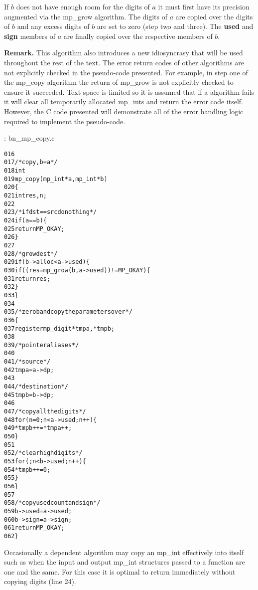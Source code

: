 \documentclass[b5paper]{book}
\begin{document}
If $b$ does not have enough room for the digits of $a$ it must first have its precision augmented via the mp\_grow 
algorithm.  The digits of $a$ are copied over the digits of $b$ and any excess digits of $b$ are set to zero (step two
and three).  The \textbf{used} and \textbf{sign} members of $a$ are finally copied over the respective members of
$b$.

\textbf{Remark.}  This algorithm also introduces a new idiosyncrasy that will be used throughout the rest of the
text.  The error return codes of other algorithms are not explicitly checked in the pseudo-code presented.  For example, in 
step one of the mp\_copy algorithm the return of mp\_grow is not explicitly checked to ensure it succeeded.  Text space is 
limited so it is assumed that if a algorithm fails it will clear all temporarily allocated mp\_ints and return
the error code itself.  However, the C code presented will demonstrate all of the error handling logic required to 
implement the pseudo-code.

\vspace{+3mm}\begin{small}
\hspace{-5.1mm}{\bf File}: bn\_mp\_copy.c
\vspace{-3mm}
\begin{alltt}
016   
017   /* copy, b = a */
018   int
019   mp_copy (mp_int * a, mp_int * b)
020   \{
021     int     res, n;
022   
023     /* if dst == src do nothing */
024     if (a == b) \{
025       return MP_OKAY;
026     \}
027   
028     /* grow dest */
029     if (b->alloc < a->used) \{
030        if ((res = mp_grow (b, a->used)) != MP_OKAY) \{
031           return res;
032        \}
033     \}
034   
035     /* zero b and copy the parameters over */
036     \{
037       register mp_digit *tmpa, *tmpb;
038   
039       /* pointer aliases */
040   
041       /* source */
042       tmpa = a->dp;
043   
044       /* destination */
045       tmpb = b->dp;
046   
047       /* copy all the digits */
048       for (n = 0; n < a->used; n++) \{
049         *tmpb++ = *tmpa++;
050       \}
051   
052       /* clear high digits */
053       for (; n < b->used; n++) \{
054         *tmpb++ = 0;
055       \}
056     \}
057   
058     /* copy used count and sign */
059     b->used = a->used;
060     b->sign = a->sign;
061     return MP_OKAY;
062   \}
\end{alltt}
\end{small}

Occasionally a dependent algorithm may copy an mp\_int effectively into itself such as when the input and output
mp\_int structures passed to a function are one and the same.  For this case it is optimal to return immediately without 
copying digits (line 24).  
\end{document}
